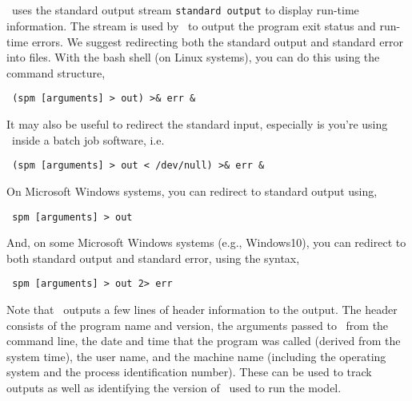 \subsection{\label{sec:redirecting-stdout}}

\SPM\ uses the standard output stream \texttt{standard output} to display run-time information. The  stream is used by \SPM\ to output the program exit status and run-time errors. We suggest redirecting both the standard output and standard error into files. With the bash shell (on Linux systems), you can do this using the command structure,

\begin{verbatim} (spm [arguments] > out) >& err &\end{verbatim}

It may also be useful to redirect the standard input, especially is you're using \SPM\ inside a batch job software, i.e. 

\begin{verbatim} (spm [arguments] > out < /dev/null) >& err &\end{verbatim}

On Microsoft Windows systems, you can redirect to standard output using,

\begin{verbatim} spm [arguments] > out\end{verbatim}

And, on some Microsoft Windows systems (e.g., Windows10), you can redirect to both standard output and standard error, using the syntax, 

\begin{verbatim} spm [arguments] > out 2> err\end{verbatim}

Note that \SPM\ outputs a few lines of header information to the output. The header consists of the program name and version, the arguments passed to \SPM\ from the command line, the date and time that the program was called (derived from the system time), the user name, and the machine name (including the operating system and the process identification number). These can be used to track outputs as well as identifying the version of \SPM\ used to run the model.

\subsection{\label{sec:command-line-arguments}}

